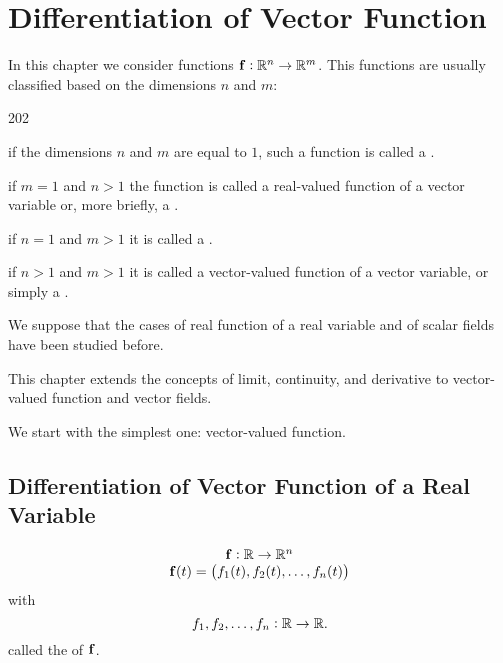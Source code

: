 \chapter{Differentiation of  Vector Function}

In this chapter  we  consider functions $\mathbf{ f}: \mathbb{R}^n\to \mathbb{R}^m$.  This functions are usually classified based on the dimensions $n$ and $m$:

\begin{dingautolist}{202}
\item if the  dimensions $n$ and $m$ are equal to $1$, such a function is called a . 
\item if  $m = 1$ and $n>1$ the function is called a
real-valued function of a vector variable or, more briefly, a . 
\item if  $n = 1$ and $m > 1$ it is called a .
\item if  $n>1$ and $m > 1$ it is called a vector-valued function of a vector variable, or simply a .
\end{dingautolist}
We suppose that the  cases of real function of a real variable and of scalar fields  have been studied before.


This chapter extends the concepts of limit, continuity, and derivative to vector-valued function and
vector fields.

We start with the simplest one: vector-valued function.


\section{Differentiation of Vector Function  of a Real Variable}





\[
\begin{array}{c}
\mathbf{ f}: {\mathbb{R}\rightarrow \mathbb{R}^n} \\ 
\mathbf{ f}(t)=\left(f_1(t),f_2(t),\dots, f_n(t)\right)
\end{array}
\]
with 
\[
f_1,f_2,\dots,f_n:{\mathbb{R}\rightarrow \mathbb{R}.} 
\]
called the  of $\mathbf{ f}$.




